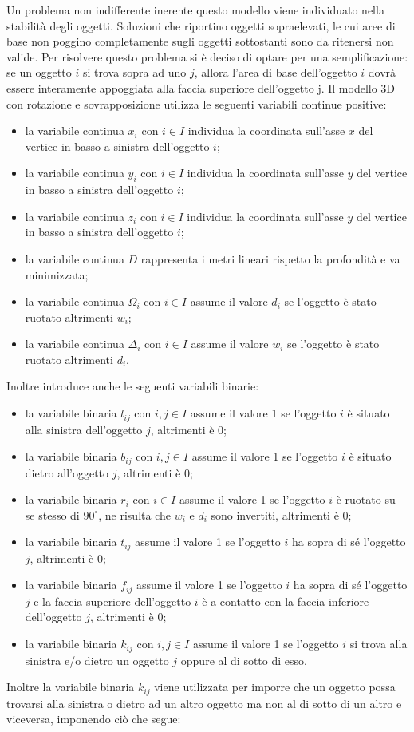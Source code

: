 Un problema non indifferente inerente questo modello viene individuato nella stabilità degli oggetti. 
Soluzioni che riportino oggetti sopraelevati, le cui aree di base non poggino completamente sugli oggetti sottostanti sono da ritenersi non valide. Per risolvere questo problema si è deciso di optare per una semplificazione: se un oggetto $i$ si trova sopra ad uno $j$, allora l'area di base dell'oggetto $i$ dovrà essere interamente appoggiata alla faccia superiore dell'oggetto j.
\newpage
Il modello 3D con rotazione e sovrapposizione utilizza le seguenti variabili continue positive:
\begin{itemize}
	\item la variabile continua $x_{i}$ con $i \in I$ individua la coordinata sull'asse $x$ del vertice in basso a sinistra dell'oggetto $i$;
	\item la variabile continua $y_{i}$ con $i \in I$ individua la coordinata sull'asse $y$ del vertice in basso a sinistra dell'oggetto $i$;
	\item la variabile continua $z_{i}$ con $i \in I$ individua la coordinata sull'asse $y$ del vertice in basso a sinistra dell'oggetto $i$;
	\item la variabile continua $D$ rappresenta i metri lineari rispetto la profondità e va minimizzata;
	\item la variabile continua $\Omega_{i}$ con $i \in I$ assume il valore $d_i$ se l'oggetto è stato ruotato altrimenti $w_i$;
	\item la variabile continua $\Delta_{i}$ con $i \in I$ assume il valore $w_i$ se l'oggetto è stato ruotato altrimenti $d_i$.
\end{itemize}
Inoltre introduce anche le seguenti variabili binarie:
\begin{itemize}
	\item la variabile binaria $l_{ij}$ con $i,j \in I$ assume il valore 1 se l'oggetto $i$ è situato alla sinistra dell'oggetto $j$, altrimenti è 0;
	\item la variabile binaria $b_{ij}$ con $i,j \in I$ assume il valore 1 se l'oggetto $i$ è situato dietro all'oggetto $j$, altrimenti è 0;
	\item la variabile binaria $r_{i}$ con $i \in I$ assume il valore 1 se l'oggetto $i$ è ruotato su se stesso di $90^{\circ}$, ne risulta che $w_{i}$ e $d_{i}$ sono invertiti, altrimenti è 0;
	\item la variabile binaria $t_{ij}$ assume il valore 1 se l'oggetto $i$ ha sopra di sé l'oggetto $j$, altrimenti è 0;
	\item la variabile binaria $f_{ij}$ assume il valore 1 se l'oggetto $i$ ha sopra di sé l'oggetto $j$ e la faccia superiore dell'oggetto $i$ è a contatto con la faccia inferiore dell'oggetto $j$, altrimenti è 0;
	\item la variabile binaria $k_{ij}$ con $i,j \in I$ assume il valore 1 se l'oggetto $i$ si trova alla sinistra e/o dietro un oggetto $j$ oppure al di sotto di esso. 
\end{itemize}
\newpage
Inoltre la variabile binaria $k_{ij}$ viene utilizzata per imporre che un oggetto possa trovarsi alla sinistra o dietro ad un altro oggetto ma non al di sotto di un altro e viceversa, imponendo ciò che segue:

